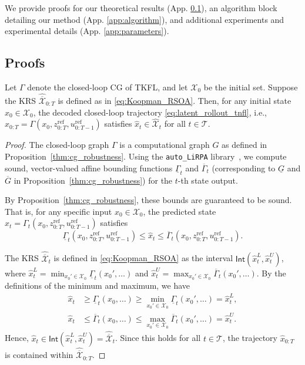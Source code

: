 \documentclass{l4dc2026}
\begin{document}
We provide proofs for our theoretical results (App. \ref{app:proofs}), an algorithm block detailing our method (App. \ref{app:algorithm}), and additional experiments and experimental details (App. \ref{app:parameters}).
\subsection{Proofs}\label{app:proofs}
\setcounter{theorem}{0}
\begin{lemma}
\label{lem:koopman_containment}
Let $\Gamma$ denote the closed-loop CG of TKFL, and let $\mathcal{X}_0$ be the initial set. Suppose the KRS $\hat{\overline{\mathcal{X}}}_{0:T}$ is defined as in \eqref{eq:Koopman_RSOA}. Then, for any initial state $x_0 \in \mathcal{X}_0$, the decoded closed-loop trajectory \eqref{eq:latent_rollout_tnfl}, i.e., 
$\hat{x}_{0:T} = \Gamma(x_0, z^{\text{ref}}_{0:T}, u^{\text{ref}}_{0:T-1})$ satisfies $\hat{x}_t \in \hat{\mathcal{X}}_t$ for all $t \in \mathcal{T}$.
\end{lemma}

\begin{proof}
The closed-loop graph $\Gamma$ is a computational graph $G$ as defined in Proposition~\ref{thm:cg_robustness}. Using the \texttt{auto\_LiRPA} library~\cite{Xu2020AutoLiRPA}, we compute sound, vector-valued affine bounding functions $\underline{\Gamma}_t$ and $\overline{\Gamma}_t$ (corresponding to $\underline{G}$ and $\overline{G}$ in Proposition~\ref{thm:cg_robustness}) for the $t$-th state output.

By Proposition~\ref{thm:cg_robustness}, these bounds are guaranteed to be sound. That is, for any specific input $x_0 \in \mathcal{X}_0$, the predicted state 
$\hat{x}_t = \Gamma_t(x_0, z^{\text{ref}}_{0:T}, u^{\text{ref}}_{0:T-1})$ satisfies
\[
\underline{\Gamma}_t(x_0, z^{\text{ref}}_{0:T}, u^{\text{ref}}_{0:T-1}) 
\le \hat{x}_t 
\le \overline{\Gamma}_t(x_0, z^{\text{ref}}_{0:T}, u^{\text{ref}}_{0:T-1}).
\]

The KRS $\hat{\overline{\mathcal{X}}}_t$ is defined in \eqref{eq:Koopman_RSOA} as the interval $\textsf{Int}(\hat{x}_t^L, \hat{x}_t^U)$, where $\hat{x}_t^L = \min_{x_0' \in \mathcal{X}_0} \underline{\Gamma}_t(x_0', \dots)$ and $\hat{x}_t^U = \max_{x_0' \in \mathcal{X}_0} \overline{\Gamma}_t(x_0', \dots)$.
By the definitions of the minimum and maximum, we have
\begin{align*}
    \hat{x}_t 
    &\ge \underline{\Gamma}_t(x_0, \dots) 
     \ge \min_{x_0' \in \mathcal{X}_0} \underline{\Gamma}_t(x_0', \dots) 
     = \hat{x}_t^L,\\
    \hat{x}_t 
    &\le \overline{\Gamma}_t(x_0, \dots) 
     \le \max_{x_0' \in \mathcal{X}_0} \overline{\Gamma}_t(x_0', \dots) 
     = \hat{x}_t^U.
\end{align*}
Hence, $\hat{x}_t \in \textsf{Int}(\hat{x}_t^L, \hat{x}_t^U) = \hat{\overline{\mathcal{X}}}_t$. Since this holds for all $t \in \mathcal{T}$, the trajectory $\hat{x}_{0:T}$ is contained within $\hat{\overline{\mathcal{X}}}_{0:T}$.
\end{proof}
\end{document}
